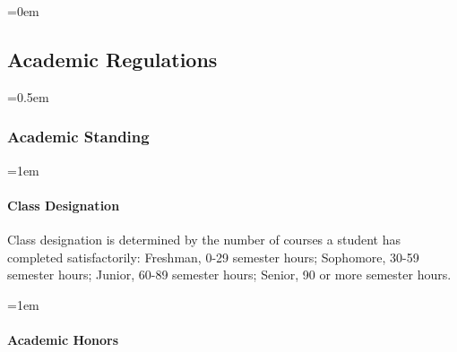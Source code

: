 \documentclass{manual}
\let\oldsubsection\subsection
\renewcommand\subsection{\leftskip=0em\oldsubsection}
\let\oldsubsubsection\subsubsection
\renewcommand\subsubsection{\leftskip=0.5em\oldsubsubsection}
\let\oldparagraph\paragraph
\renewcommand\paragraph{\leftskip=1em\oldparagraph}
\begin{document}
	\subsection{Academic Regulations}\label{sec:AcademicRegulations}

		\subsubsection{Academic Standing}\label{sub:AcademicStanding}

			\paragraph{Class Designation }
			Class designation is determined by the number of courses a student has completed satisfactorily: Freshman, 0-29 semester hours; Sophomore, 30-59 semester hours; Junior, 60-89 semester hours; Senior, 90 or more semester hours.

			\paragraph{Academic Honors}
\end{document}
